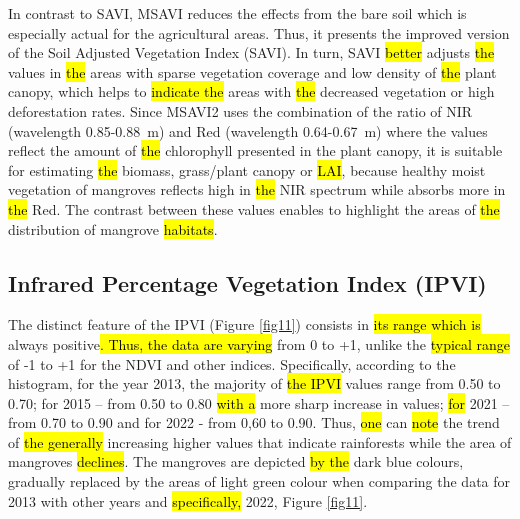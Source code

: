 \documentclass[jmse,article,submit,pdftex,moreauthors]{Definitions/mdpi}
\begin{document}
In contrast to SAVI, MSAVI reduces the effects from the bare soil which is especially actual for the agricultural areas. Thus, it presents the improved version of the Soil Adjusted Vegetation Index (SAVI). In turn, SAVI \hl{better }adjusts \hl{the }values in \hl{the }areas with sparse vegetation coverage and low density of \hl{the }plant canopy, which\hl{ }helps to \hl{indicate the} areas with \hl{the }decreased vegetation\hl{ }or high deforestation rates. Since MSAVI2 uses the combination of the ratio of NIR (wavelength 0.85-0.88~{\textmu}m) and Red (wavelength 0.64-0.67~{\textmu}m) where the values reflect the amount of \hl{the }chlorophyll presented in the plant canopy, it is suitable for estimating \hl{the }biomass, grass/plant canopy or \hl{LAI}, because healthy moist vegetation of mangroves reflects high in \hl{the }NIR spectrum while absorbs more in \hl{the }Red. The contrast between these values enables to highlight the areas of \hl{the }distribution of mangrove \hl{habitats}.

\subsection{Infrared Percentage Vegetation Index (IPVI)}

The distinct feature of the IPVI (Figure \ref{fig11}) consists in \hl{its range which is }always positive\hl{. Thus, the data are varying }from 0 to +1, unlike the \hl{typical range} of -1 to +1 for the NDVI and other indices. Specifically, according to the histogram, for the year 2013, the majority of \hl{the IPVI }values\hl{ }range from 0.50 to 0.70; for 2015 -- from 0.50 to 0.80 \hl{with a} more sharp increase in values; \hl{for} 2021 -- from 0.70 to 0.90 and for 2022 - from 0,60 to 0.90. Thus, \hl{one} can \hl{note} the trend of \hl{the generally }increasing higher values that indicate rainforests while the area of mangroves \hl{declines}. The mangroves are depicted \hl{by the} dark blue colours, gradually replaced by the areas of light green colour when comparing the data for 2013 with other years and \hl{specifically, }2022, Figure \ref{fig11}.
\end{document}
